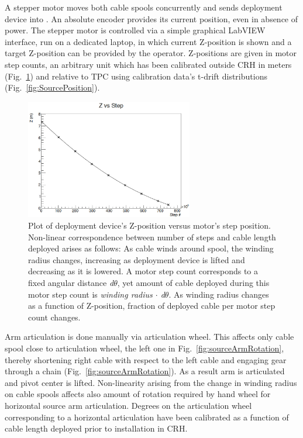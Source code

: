 A stepper motor moves both cable spools concurrently and sends deployment device into \lsv. An absolute encoder provides its current position, even in absence of power. The stepper motor is controlled via a simple graphical LabVIEW interface, run on a dedicated laptop, in which current Z-position is shown and a target Z-position can be provided by the operator. Z-positions are given in motor step counts, an arbitrary unit which has been calibrated outside CRH in meters (Fig.~\ref{fig:z_test}) and relative to TPC using calibration data's t-drift distributions (Fig.~\ref{fig:SourcePosition}).

\begin{figure}[htbp]
 \centering
 \includegraphics[width=0.65\textwidth]{Figures/Z_positioning_test}
 \caption{Plot of deployment device's Z-position versus motor's step position. Non-linear correspondence between number of steps and cable length deployed arises as follows: As cable winds around spool, the winding radius changes, increasing as deployment device is lifted and decreasing as it is lowered. A motor step count corresponds to a fixed angular distance \textit{d$\theta$}, yet amount of cable deployed during this motor step count is \textit{winding radius $\cdot$ d$\theta$}. As winding radius changes as a function of Z-position, fraction of deployed cable per motor step count changes.}
 \label{fig:z_test}
\end{figure}

\label{sec:Nonlinearity:MotorStepCounts}
Arm articulation is done manually via articulation wheel. This affects only cable spool close to articulation wheel, the left one in Fig.~\ref{fig:sourceArmRotation}, thereby shortening right cable with respect to the left cable and engaging gear through a chain (Fig.~\ref{fig:sourceArmRotation}). As a result arm is articulated and pivot center is lifted. Non-linearity arising from the change in winding radius on cable spools affects also amount of rotation required by hand wheel for horizontal source arm articulation.
Degrees on the articulation wheel corresponding to a horizontal articulation have been calibrated as a function of cable length deployed prior to installation in CRH.

